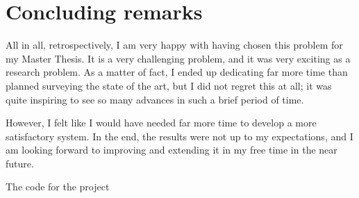 \section{Concluding remarks}

All in all, retrospectively, I am very happy with having chosen this problem for my Master Thesis. It is a very challenging problem, and it was very exciting as a research problem. As a matter of fact, I ended up dedicating far more time than planned surveying the state of the art, but I did not regret this at all; it was quite inspiring to see so many advances in such a brief period of time.

However, I felt like I would have needed far more time to develop a more satisfactory system. In the end, the results were not up to my expectations, and I am looking forward to improving and extending it in my free time in the near future.

The code for the project
